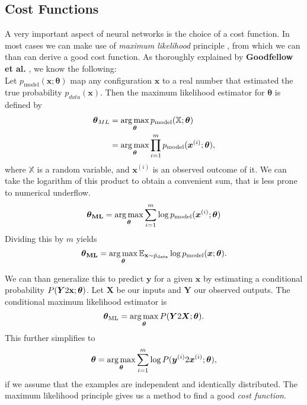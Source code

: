\subsection{Cost Functions}
\label{sec:cost-functions}

A very important aspect of neural networks is the choice of a cost function.
In most cases we can make use of \emph{maximum likelihood} principle \cite{Cramer:444796}, from which we can than can derive a good cost function.
As thoroughly explained by \textbf{Goodfellow et al.} \cite{Goodfellow-et-al-2016}, we know the following: \\

Let \(p_{\text{model}}(\boldsymbol{x}; \boldsymbol{\theta})\) map any configuration \(\boldsymbol{x}\) to a real number that estimated the true probability \(p_{data}(\boldsymbol{x})\).
Then the maximum likelihood estimator for \(\boldsymbol{\theta}\) is defined by
\begin{align}
    \boldsymbol{\theta}_{ML} &= \operatorname*{arg\,max}_{\boldsymbol{\theta}} p_{\text{model}} (\mathbb{X}; \boldsymbol{\theta}) \\
    &= \operatorname*{arg\,max}_{\boldsymbol{\theta}} \prod^{m}_{i = 1} p_{\text{model}} (\boldsymbol{x}^{(i)}; \boldsymbol{\theta}),
\end{align}
where \(\mathbb{X}\) is a random variable, and \(\boldsymbol{x}^{(i)}\) is an observed outcome of it.
We can take the logarithm of this product to obtain a convenient sum, that is less prone to numerical underflow.
\begin{equation}
    \boldsymbol{\theta}_{\textbf{ML}} = \operatorname*{arg\,max}_{\boldsymbol{\theta}} \sum^{m}_{i = 1} \log p_{\text{model}} (\boldsymbol{x}^{(i)}; \boldsymbol{\theta})
\end{equation}
Dividing this by \(m\) yields
\begin{equation}
    \boldsymbol{\theta}_{\textbf{ML}} = \operatorname*{arg\,max}_{\boldsymbol{\theta}} \mathbb{E}_{\mathbf{x} \sim \hat{p}_{\text{data}}} \log p_{\text{model}} (\boldsymbol{x}; \boldsymbol{\theta}).
\end{equation}

We can than generalize this to predict \(\boldsymbol{y}\) for a given \(\boldsymbol{x}\) by estimating a conditional probability \(P(\boldsymbol{Y} 2 \mathbf{x}; \boldsymbol{\theta})\).
Let \(\boldsymbol{X}\) be our inputs and \(\boldsymbol{Y}\) our observed outputs.
The conditional maximum likelihood estimator is
\begin{equation}
    \boldsymbol{\theta}_{\text{ML}} = \operatorname*{arg\,max}_{\boldsymbol{\theta}} P (\boldsymbol{Y} 2 \boldsymbol{X}; \boldsymbol{\theta}).
\end{equation}
This further simplifies to
\begin{equation}
    \boldsymbol{\theta} = \operatorname*{arg\,max}_{\boldsymbol{\theta}} \sum^{m}_{i = 1} \log P (\boldsymbol{y}^{(i)} 2 \boldsymbol{x}^{(i)}; \boldsymbol{\theta}),
\end{equation}
if we assume that the examples are independent and identically distributed.
The maximum likelihood principle gives us a method to find a good \emph{cost function}.

